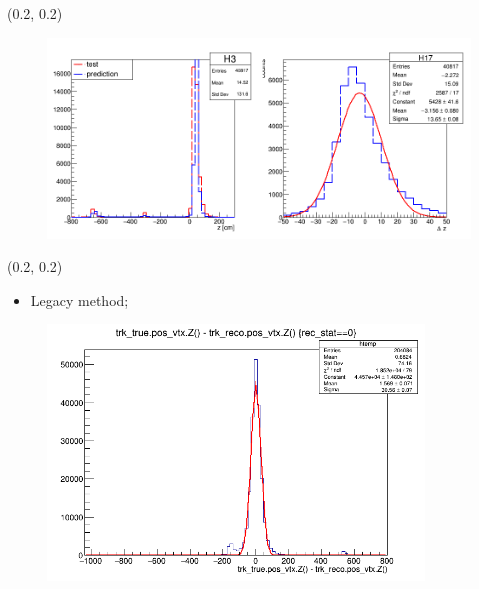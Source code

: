 \documentclass[12pt, xcolor={dvipsnames}, aspectratio = 169]{beamer}
\begin{document}
\begin{frame}

\begin{textblock}{14.0}(0.2, 0.2)
    \begin{figure}
        \centering
        \includegraphics[width=14.0cm]{../imgs/vtz.png}
    \end{figure}
\end{textblock}

\end{frame}

\begin{frame}

\begin{textblock}{10.0}(0.2, 0.2)

\begin{itemize}

    \item Legacy method;

\end{itemize}

    \begin{figure}
        \centering
        \includegraphics[width=10.0cm]{../imgs/c1.png}
    \end{figure}
\end{textblock}

\end{frame}
\end{document}
